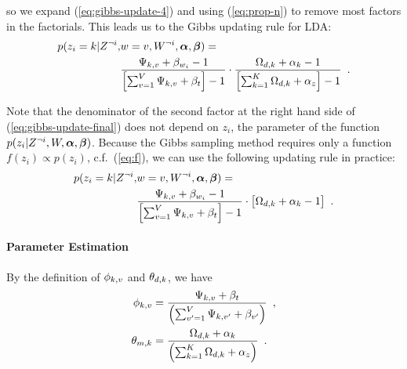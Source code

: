 so we expand (\ref{eq:gibbs-update-4}) and using (\ref{eq:prop-n}) to
remove most factors in the factorials.  This leads us to the Gibbs
updating rule for LDA:
\begin{equation}
  \label{eq:gibbs-update-5}
  \begin{split}
    p(z_i=k|Z^{\neg i},&w=v,W^{\neg i},\boldsymbol{\alpha},\boldsymbol{\beta})
    =
    \\
    & \frac{
      \Psi_{k,v} + \beta_{w_i} - 1
    }{
      \left[ \sum_{v=1}^{V}  \Psi_{k,v} + \beta_{t} \right] - 1
    }
    \cdot
    \frac{
      \Omega_{d,k} + \alpha_{k} - 1
    }{
      \left[ \sum_{k=1}^{K}  \Omega_{d,k} + \alpha_{z} \right] - 1
    }
    \enspace.
  \end{split}
\end{equation}

Note that the denominator of the second factor at the right hand side
of (\ref{eq:gibbs-update-final}) does not depend on $z_i$, the
parameter of the function
$p(z_i|Z^{\neg i},W,\boldsymbol{\alpha},\boldsymbol{\beta})$.  Because the
Gibbs sampling method requires only a function
$f(z_i)\propto{}p(z_i)$, c.f.~(\ref{eq:f}), we can use the following
updating rule in practice:
\begin{equation}
  \label{eq:gibbs-update-final}
  \begin{split}
    p(z_i=k|Z^{\neg i},&w=v,W^{\neg i},\boldsymbol{\alpha},\boldsymbol{\beta})
    =
    \\
    & \frac{
      \Psi_{k,v} + \beta_{w_i} - 1
    }{
      \left[ \sum_{v=1}^{V}  \Psi_{k,v} + \beta_{t} \right] - 1
    }
    \cdot
    \big[
      \Omega_{d,k} + \alpha_{k} - 1
    \big]
    \enspace.
  \end{split}
\end{equation}


\paragraph{Parameter Estimation}

By the definition of $\phi_{k,v}$ and $\theta_{d,k}$, we have
\begin{equation}
  \label{eq:read-out-final}
  \begin{split}
  \phi_{k,v}
  &=
  \frac{
    \Psi_{k,v} + \beta_{t}
  }{
    \left( \sum_{v'=1}^{V}  \Psi_{k,v'} + \beta_{v'} \right)
  }
  \enspace,
  \\
  \theta_{m,k}
  &=
  \frac{
    \Omega_{d,k} + \alpha_{k}
  }{
    \left( \sum_{k=1}^{K}  \Omega_{d,k} + \alpha_{z} \right)
  }
  \enspace.
  \end{split}
\end{equation}


